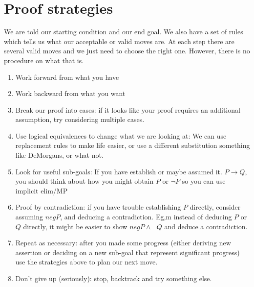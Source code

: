 \documentclass[../MATH-2000-Notes.tex]{subfiles}
\begin{document}
\section{Proof strategies}
We are told our starting condition and our end goal. We also have a set of rules which tells us what our acceptable or valid moves are. At each step there are several valid moves and we just need to choose the right one. However, there is no procedure on what that is.
\begin{enumerate}
    \item Work forward from what you have
    \item Work backward from what you want
    \item Break our proof into cases: if it looks like your proof requires an additional assumption, try considering multiple cases.
    \item Use logical equivalences to change what we are looking at: We can use replacement rules to make life easier, or use a different substitution something like DeMorgans, or what not.
    \item Look for useful sub-goals: If you have establish or maybe assumed it. \(P\rightarrow Q\), you should think about how you might obtain \(P\) or \(\neg P\) so you can use implicit elim/MP
    \item Proof by contradiction: if you have trouble establishing \(P\) directly, consider assuming \(neg P\), and deducing a contradiction. Eg,m instead of deducing \(P\) or \(Q\) directly, it might be easier to show \(neg P \wedge \neg Q\) and deduce a contradiction.
    \item Repeat as necessary: after you made some progress (either deriving new assertion or deciding on a new sub-goal that represent significant progress) use the strategies above to plan our next move.
    \item Don't give up (seriously): stop, backtrack and try something else.
\end{enumerate}
\end{document}
